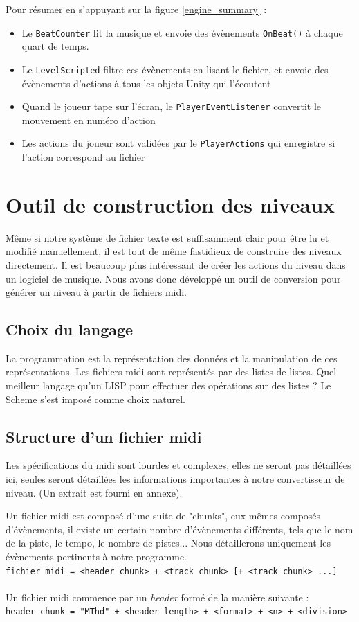 Pour résumer en s'appuyant sur la figure \ref{engine_summary} :
\begin{itemize}
\item Le \texttt{BeatCounter} lit la musique et envoie des évènements \texttt{OnBeat()} à chaque quart de temps.
\item Le \texttt{LevelScripted} filtre ces évènements en lisant le fichier, et envoie des évènements d'actions à tous les objets Unity qui l'écoutent
\item Quand le joueur tape sur l'écran, le \texttt{PlayerEventListener} convertit le mouvement en numéro d'action
\item Les actions du joueur sont validées par le \texttt{PlayerActions} qui enregistre si l'action correspond au fichier
\end{itemize}

\section{Outil de construction des niveaux}

Même si notre système de fichier texte est suffisamment clair pour être lu et modifié manuellement, il est tout de même fastidieux de construire des niveaux directement. Il est beaucoup plus intéressant de créer les actions du niveau dans un logiciel de musique. Nous avons donc développé un outil de conversion pour générer un niveau à partir de fichiers midi.

\subsection{Choix du langage}
La programmation est la représentation des données et la manipulation de ces représentations. Les fichiers midi sont représentés par des listes de listes. Quel meilleur langage qu'un LISP pour effectuer des opérations sur des listes ? Le Scheme s'est imposé comme choix naturel.

\subsection{Structure d'un fichier midi}
Les spécifications du midi sont lourdes et complexes, elles ne seront pas détaillées ici, seules seront détaillées les informations importantes à notre convertisseur de niveau. (Un extrait est fourni en annexe).

Un fichier midi est composé d'une suite de "chunks", eux-mêmes composés d'évènements, il existe un certain nombre d'évènements différents, tels que le nom de la piste, le tempo, le nombre de pistes... Nous détaillerons uniquement les évènements pertinents à notre programme.\\
{\small \texttt{fichier midi = <header chunk> + <track chunk> [+ <track chunk> ...]}}\\\\
Un fichier midi commence par un \textit{header} formé de la manière suivante :\\
{\small \texttt{header chunk = "MThd" + <header length> + <format> + <n> + <division>}}\\

